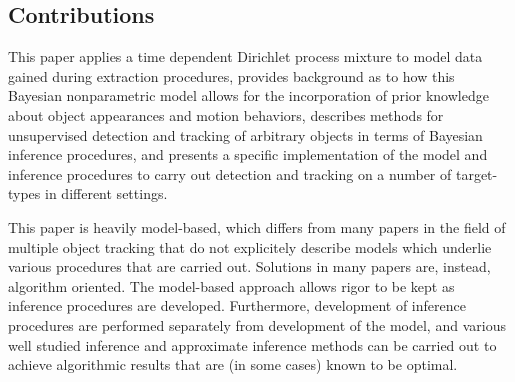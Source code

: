 \documentclass{article}
\begin{document}


\subsection{Contributions}

This paper applies a time dependent Dirichlet process mixture to model data gained during extraction procedures, provides background as to how this Bayesian nonparametric model allows for the incorporation of prior knowledge about object appearances and motion behaviors, describes methods for unsupervised detection and tracking of arbitrary objects in terms of Bayesian inference procedures, and presents a specific implementation of the model and inference procedures to carry out detection and tracking on a number of target-types in different settings.

This paper is heavily model-based, which differs from many papers in the field of multiple object tracking that do not explicitely describe models which underlie various procedures that are carried out. Solutions in many papers are, instead, algorithm oriented. The model-based approach allows rigor to be kept as inference procedures are developed. Furthermore, development of inference procedures are performed separately from development of the model, and various well studied inference and approximate inference methods can be carried out to achieve algorithmic results that are (in some cases) known to be optimal.
	
\end{document}
